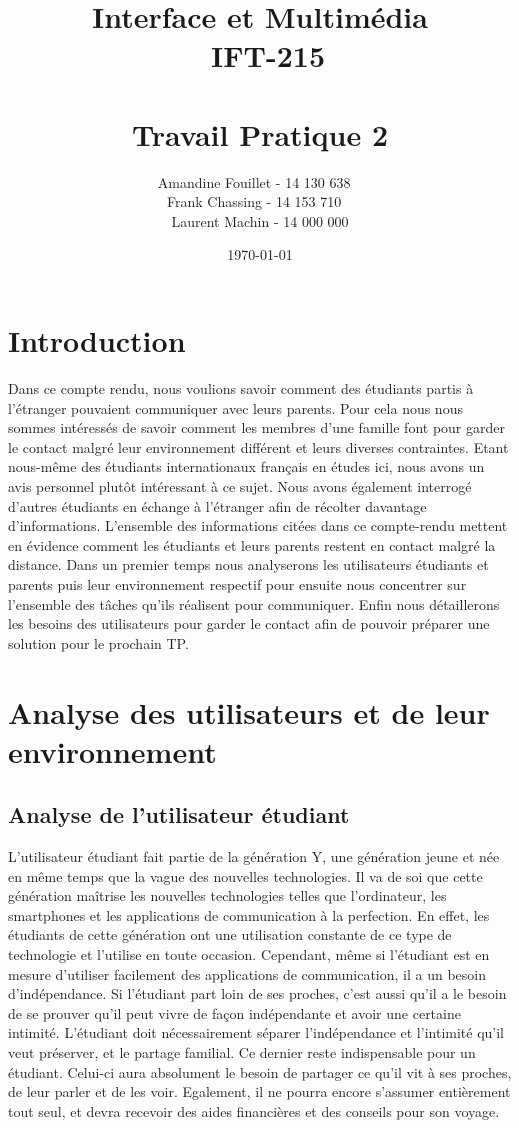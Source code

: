 \documentclass[12pt]{article}
\title{\vspace{\fill} Interface et Multimédia \\ ~\textbf{IFT-215} \\~\\ Travail Pratique 2}
\author{Amandine Fouillet - 14 130 638 ~\\ Frank Chassing - 14 153 710 ~\\ Laurent Machin - 14 000 000}
\date{\today \vspace{\fill}}
\begin{document}
\maketitle
\newpage

\section{Introduction}

Dans ce compte rendu, nous voulions savoir comment des étudiants partis à l’étranger pouvaient communiquer avec leurs parents. Pour cela nous nous sommes intéressés de savoir comment les membres d’une famille font pour garder le contact malgré leur environnement différent et leurs diverses contraintes. Etant nous-même des étudiants internationaux français en études ici, nous avons un avis personnel plutôt intéressant à ce sujet. Nous avons également interrogé d’autres étudiants en échange à l’étranger afin de récolter davantage d’informations. L’ensemble des informations citées dans ce compte-rendu mettent en évidence comment les étudiants et leurs parents restent en contact malgré la distance. Dans un premier temps nous analyserons les utilisateurs étudiants et parents puis leur environnement respectif pour ensuite nous concentrer sur l’ensemble des tâches qu’ils réalisent pour communiquer. Enfin nous détaillerons les besoins des utilisateurs pour garder le contact afin de pouvoir préparer une solution pour le prochain TP. 


\section{Analyse des utilisateurs et de leur environnement}

\subsection{Analyse de l’utilisateur étudiant}

L’utilisateur étudiant fait partie de la génération Y, une génération jeune et née en même temps que la vague des nouvelles technologies. Il va de soi que cette génération maîtrise les nouvelles technologies telles que l’ordinateur, les smartphones et les applications de communication à la perfection.  En effet, les étudiants de cette génération ont une utilisation constante de ce type de technologie et l’utilise en toute occasion. Cependant, même si l’étudiant est en mesure d’utiliser facilement des applications de communication, il a un besoin d’indépendance. Si l’étudiant part loin de ses proches, c’est aussi qu’il a le besoin de se prouver qu’il peut vivre de façon indépendante et avoir une certaine intimité. L’étudiant doit nécessairement séparer l’indépendance et l’intimité qu’il veut préserver, et  le partage familial. Ce dernier reste indispensable pour un étudiant. Celui-ci aura absolument le besoin de partager ce qu’il vit à ses proches, de leur parler et de les voir.  Egalement, il ne pourra encore s’assumer entièrement tout seul, et devra recevoir des aides financières et des conseils pour son voyage.
\end{document}
